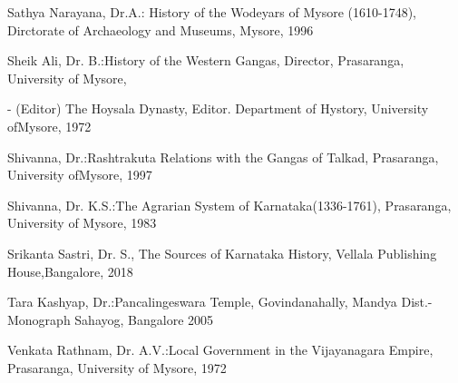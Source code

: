 \noindent
Sathya Narayana, Dr.A.: History of the Wodeyars of Mysore (1610-1748), Dirctorate of Archaeology and Museums, Mysore, 1996

\noindent
Sheik Ali, Dr. B.:History of the Western Gangas, Director, Prasaranga, University of Mysore,

- (Editor) The Hoysala Dynasty, Editor. Department of Hystory, University of\break Mysore, 1972

\noindent
Shivanna, Dr.:Rashtrakuta Relations with the Gangas of Talkad, Prasaranga, University of\break Mysore, 1997

\noindent
Shivanna, Dr. K.S.:The Agrarian System of Karnataka(1336-1761), Prasaranga, University of Mysore, 1983

\noindent
Srikanta Sastri, Dr. S., The Sources of Karnataka History, Vellala Publishing House,\break Bangalore, 2018

\noindent
Tara Kashyap, Dr.:Pancalingeswara Temple, Govindanahally, Mandya Dist.- Monograph Sahayog, Bangalore 2005

\noindent
Venkata Rathnam, Dr. A.V.:Local Government in the Vijayanagara Empire, Prasaranga, University of Mysore, 1972

